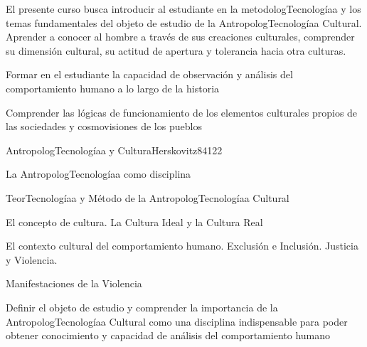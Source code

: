 \begin{syllabus}


\begin{justification}    
El presente curso busca introducir al estudiante en la metodologTecnologíaa y los temas fundamentales del 
objeto de estudio de la AntropologTecnologíaa Cultural. Aprender a conocer al hombre a través de sus 
creaciones culturales, comprender su dimensión cultural, su actitud de apertura y 
tolerancia hacia otra culturas.
\end{justification}

\begin{goals}
\item Formar en el estudiante la capacidad de observación y análisis del comportamiento humano a lo largo de la historia  
\item Comprender las lógicas de funcionamiento de los elementos culturales propios de las sociedades y cosmovisiones de los pueblos
\end{goals}

\begin{outcomes}
\end{outcomes}

\begin{unit}{AntropologTecnologíaa y Cultura}{Herskovitz84}{12}{2}
   \begin{topics}
      \item La AntropologTecnologíaa como disciplina
	\item TeorTecnologíaa y Método de la AntropologTecnologíaa Cultural
	\item El concepto de cultura. La Cultura Ideal y la Cultura Real
	\item El contexto cultural del comportamiento humano. Exclusión e Inclusión. Justicia y Violencia.
	\item Manifestaciones de la Violencia
   \end{topics}

   \begin{unitgoals}
      \item Definir el objeto de estudio y comprender la importancia de la AntropologTecnologíaa Cultural como una disciplina indispensable para poder obtener conocimiento y capacidad de análisis del comportamiento humano
   \end{unitgoals}
\end{unit}


\end{syllabus}
